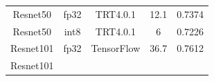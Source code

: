 \begin{longtable}[]{ ccccc }
\begin{minipage}[t]{0.09\columnwidth}\centering\strut
Resnet50\strut
\end{minipage} & \begin{minipage}[t]{0.09\columnwidth}\centering\strut
fp32\strut
\end{minipage} & \begin{minipage}[t]{0.20\columnwidth}\centering\strut
TRT4.0.1\strut
\end{minipage} & \begin{minipage}[t]{0.24\columnwidth}\centering\strut
12.1\strut
\end{minipage} & \begin{minipage}[t]{0.24\columnwidth}\centering\strut
0.7374\strut
\end{minipage}\tabularnewline
\begin{minipage}[t]{0.09\columnwidth}\centering\strut
Resnet50\strut
\end{minipage} & \begin{minipage}[t]{0.09\columnwidth}\centering\strut
int8\strut
\end{minipage} & \begin{minipage}[t]{0.20\columnwidth}\centering\strut
TRT4.0.1\strut
\end{minipage} & \begin{minipage}[t]{0.24\columnwidth}\centering\strut
6\strut
\end{minipage} & \begin{minipage}[t]{0.24\columnwidth}\centering\strut
0.7226\strut
\end{minipage}\tabularnewline
\begin{minipage}[t]{0.09\columnwidth}\centering\strut
Resnet101\strut
\end{minipage} & \begin{minipage}[t]{0.09\columnwidth}\centering\strut
fp32\strut
\end{minipage} & \begin{minipage}[t]{0.20\columnwidth}\centering\strut
TensorFlow\strut
\end{minipage} & \begin{minipage}[t]{0.24\columnwidth}\centering\strut
36.7\strut
\end{minipage} & \begin{minipage}[t]{0.24\columnwidth}\centering\strut
0.7612\strut
\end{minipage}\tabularnewline
\begin{minipage}[t]{0.09\columnwidth}\centering\strut
Resnet101\strut

\end{minipage}
\end{longtable}
